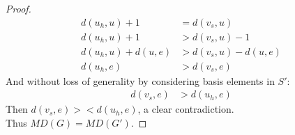 \documentclass[11pt]{amsart}
\theoremstyle{plain}  %
\newtheorem{lem}[thm]{Lemma}
\theoremstyle{definition}
\theoremstyle{remark}
\numberwithin{equation}{thm}
\begin{document}
\begin{proof}
\begin{align*}
d(u_h, u) + 1 &= d(v_s, u)\\
d(u_h, u) + 1 &> d(v_s, u) - 1\\
d(u_h, u) + d(u, e) &> d(v_s, u) - d(u, e)\\
d(u_h, e) &> d(v_s, e)
\end{align*}
And without loss of generality by considering basis elements in $S'$:
\begin{align*}
 d(v_s, e) &> d(u_h, e)
\end{align*}
Then $d(v_s, e) >< d(u_h, e)$, a clear contradiction.\\
Thus $MD(G)=MD(G')$.
\end{proof}


 






\cite{Chartrand:2010:GDF:1941879}
\nocite{*}

\end{document}
